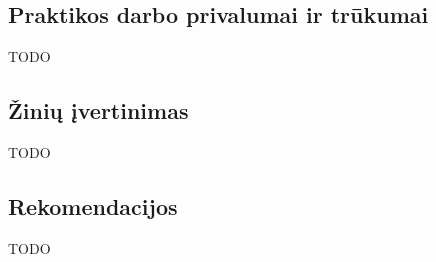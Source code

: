 \subsection{Praktikos darbo privalumai ir trūkumai}

TODO

\subsection{Žinių įvertinimas}

TODO

\subsection{Rekomendacijos}

TODO
